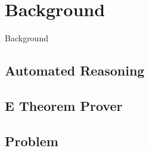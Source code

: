 \chapter{Background}\label{chap:background}
  Background

  \section{Automated Reasoning}
  \section{E Theorem Prover}
  \section{Problem}
